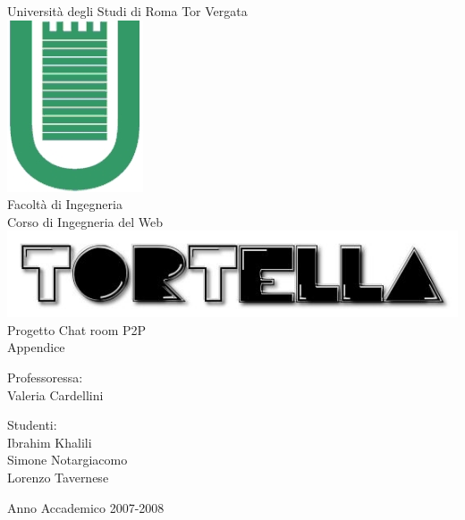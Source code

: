 \begin{titlepage}
\begin{center}
\LARGE{Università degli Studi di Roma Tor Vergata}\\
\vspace{10mm}
\includegraphics[scale=0.50]{etc/logo.jpg}\\
Facoltà di Ingegneria\\
\vspace{5mm}
\normalsize{Corso di Ingegneria del Web}\\
\vspace{20mm}
\includegraphics[scale=0.40]{etc/tortellalogo.jpg}\\
\large{Progetto Chat room P2P}\\
\large{Appendice}\\
\end{center}
\vspace{30mm}
\begin{minipage}[t]{0.30\textwidth}
\begin{center}
{\normalsize{Professoressa:\\
Valeria Cardellini}}
\end{center}
\end{minipage}
\hfill
\begin{minipage}[t]{0.30\textwidth}
\begin{center}
{\normalsize{Studenti:\\
Ibrahim Khalili\\
Simone Notargiacomo\\
Lorenzo Tavernese}}
\end{center}
\end{minipage}
\vspace{10mm}
\begin{center}
Anno Accademico 2007-2008
\end{center}

\end{titlepage}